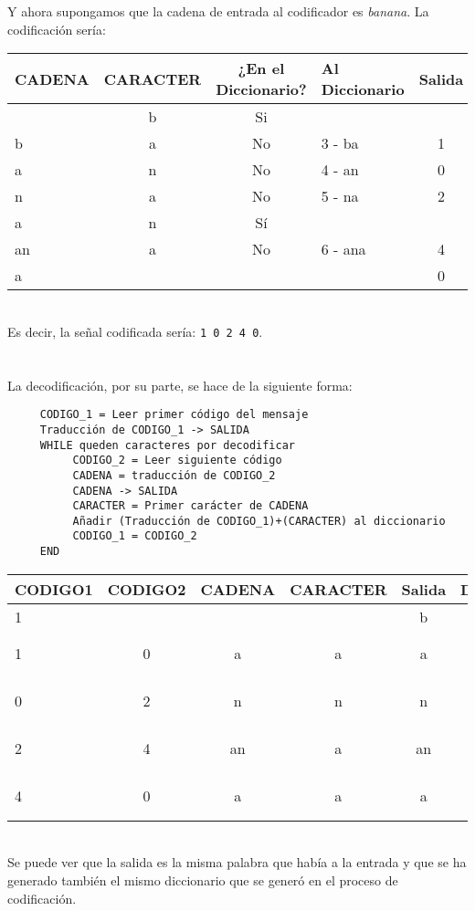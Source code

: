 \documentclass[es,apuntes]{uah}
\begin{document}
Y ahora supongamos que la cadena de entrada al codificador es \emph{banana}. La codificación sería:\\


\begin{tabular}{lcclc}
CADENA & CARACTER  & ¿En el Diccionario? & Al Diccionario & Salida \\
\hline
 	& b & Si &  &  \\
 b & a & No & 3 - ba & 1 \\
 a & n & No & 4 - an & 0 \\
 n & a & No & 5 - na & 2 \\
 a & n & Sí & 		&  \\
 an & a & No & 6 - ana & 4 \\
 a & & & & 0 \\ 	
\end{tabular}

\ \\
Es decir, la señal codificada sería: \texttt{1 0 2 4 0}. \\

\ \\
\ \\

La decodificación, por su parte, se hace de la siguiente forma:

\begin{verbatim}
     CODIGO_1 = Leer primer código del mensaje
     Traducción de CODIGO_1 -> SALIDA
     WHILE queden caracteres por decodificar
          CODIGO_2 = Leer siguiente código
          CADENA = traducción de CODIGO_2
          CADENA -> SALIDA
          CARACTER = Primer carácter de CADENA
          Añadir (Traducción de CODIGO_1)+(CARACTER) al diccionario
          CODIGO_1 = CODIGO_2
     END
\end{verbatim}


\begin{tabular}{lccccc}
CODIGO1 & CODIGO2  & CADENA & CARACTER & Salida & Dicc.\\
\hline
1 &   &   &   & b &\\
1 & 0 & a & a & a & 3 - ba \\
0 & 2 & n & n & n & 4 - an \\
2 & 4 & an & a & an & 5 - na \\
4 & 0 & a & a & a & 6 - ana \\
\end{tabular}

\ \\
Se puede ver que la salida es la misma palabra que había a la entrada y que se ha generado también el mismo diccionario que se generó en el proceso de codificación. 

\end{document}
